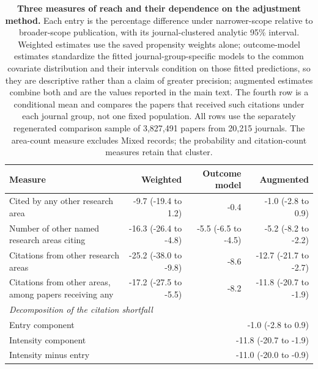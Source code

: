 \begin{table}[H]
\centering
\caption{\textbf{Three measures of reach and their dependence on the adjustment method.}
Each entry is the percentage difference under narrower-scope relative to broader-scope
publication, with its journal-clustered analytic 95\% interval. Weighted estimates use the
saved propensity weights alone; outcome-model estimates standardize the fitted
journal-group-specific models to the common covariate distribution and their intervals
condition on those fitted predictions, so they are descriptive rather than a claim of greater
precision; augmented estimates combine both and are the values reported in the main text. The
fourth row is a conditional mean and compares the papers that received such citations under each
journal group, not one fixed population. All rows use the separately regenerated comparison
sample of 3,827,491 papers from 20,215 journals. The area-count measure excludes Mixed
records; the probability and citation-count measures retain that cluster.}
\label{tab:decomposition}
\footnotesize
\setlength{\tabcolsep}{5pt}
\begin{tabular}{p{}rrr}
\toprule
Measure & Weighted & Outcome model & Augmented \\
\midrule
Cited by any other research area & -9.7 (-19.4 to 1.2) & -0.4 & -1.0 (-2.8 to 0.9) \\
Number of other named research areas citing & -16.3 (-26.4 to -4.8) & -5.5 (-6.5 to -4.5) & -5.2 (-8.2 to -2.2) \\
Citations from other research areas & -25.2 (-38.0 to -9.8) & -8.6 & -12.7 (-21.7 to -2.7) \\
Citations from other areas, among papers receiving any & -17.2 (-27.5 to -5.5) & -8.2 & -11.8 (-20.7 to -1.9) \\
\midrule
\multicolumn{4}{l}{\textit{Decomposition of the citation shortfall}} \\
\quad Entry component & \multicolumn{3}{r}{-1.0 (-2.8 to 0.9)} \\
\quad Intensity component & \multicolumn{3}{r}{-11.8 (-20.7 to -1.9)} \\
\quad Intensity minus entry & \multicolumn{3}{r}{-11.0 (-20.0 to -0.9)} \\
\bottomrule
\end{tabular}
\end{table}
